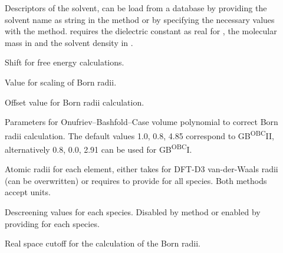 \begin{description}
  \item[] Descriptors of the solvent, can be load from a database
    by providing the solvent name as string in the  method or
    by specifying the necessary values with the  method.
     requires the dielectric constant as real for ,
    the molecular mass in   and the
    solvent density in  .

  \item[]  Shift for free energy calculations.



  \item[] Value for scaling of Born radii.

  \item[] 
    Offset value for Born radii calculation.

  \item[] Parameters for Onufriev--Bashfold--Case volume
    polynomial to correct Born radii calculation.
    The default values 1.0, 0.8, 4.85 correspond to GB\textsuperscript{OBC}II,
    alternatively 0.8, 0.0, 2.91 can be used for GB\textsuperscript{OBC}I.\cite{onufriev2004}

  \item[] Atomic radii for each element, either takes
     for DFT-D3 van-der-Waals radii (can be overwritten)
    or requires to provide  for all species.
    Both methods accept  units.

  \item[] Descreening values for each species.
    Disabled by  method or enabled by providing 
    for each species.

  \item[] 
    Real space cutoff for the calculation of the Born radii.
\end{description}

